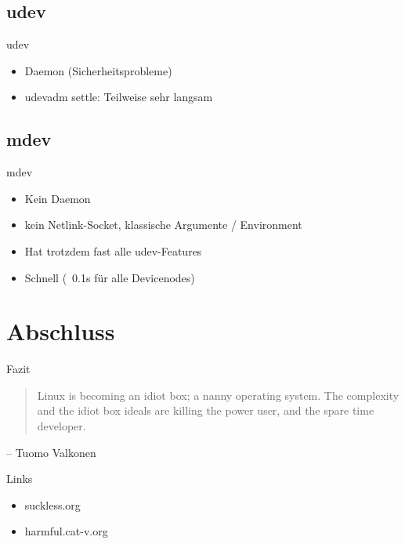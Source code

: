 \documentclass{beamer}
\begin{document}
\subsection{udev}
\begin{frame}{udev}
	\begin{itemize}
		\item Daemon (Sicherheitsprobleme)
		\item udevadm settle: Teilweise sehr langsam
	\end{itemize}
\end{frame}

\subsection{mdev}
\begin{frame}{mdev}
	\begin{itemize}
		\item Kein Daemon
		\item kein Netlink-Socket, klassische
			Argumente / Environment
		\item Hat trotzdem fast alle udev-Features
		\item Schnell (~0.1s für alle Devicenodes)
	\end{itemize}
\end{frame}

\section{Abschluss}

\begin{frame}{Fazit}
	\begin{quote}
		Linux is becoming an idiot box; a nanny operating system. The
		complexity and
		the idiot box ideals are killing the power user, and the spare time
		developer.
	\end{quote}
	\begin{flushright}
		-- Tuomo Valkonen
	\end{flushright}
\end{frame}

\begin{frame}{Links}
	\begin{itemize}
		\item suckless.org
		\item harmful.cat-v.org
	\end{itemize}
\end{frame}
\end{document}

